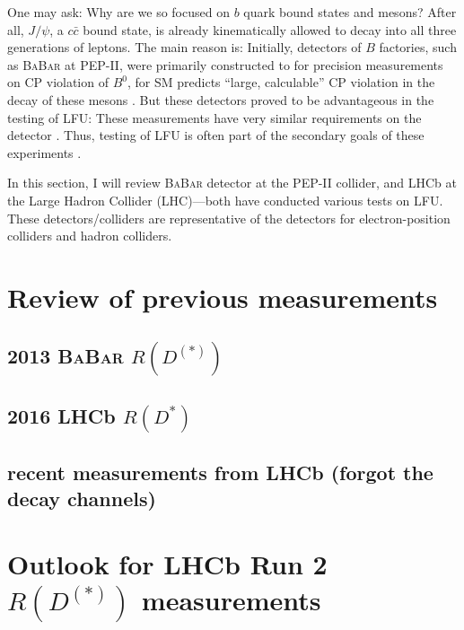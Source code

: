 \documentclass[10pt]{article}
\newcommand{\PRLrule}{
    \bigskip
    \noindent\makebox[\linewidth]{
        \resizebox{0.3333\linewidth}{1pt}{$\blacklozenge$}
    }
    \bigskip
}
\def\BaBar/{\textsc{BaBar}}
\begin{document}
One may ask: Why are we so focused on $b$ quark bound states and mesons?
After all, $J/\psi$, a $c\bar{c}$ bound state, is already kinematically allowed
to decay into all three generations of leptons.
The main reason is:
Initially, detectors of $B$ factories, such as \BaBar/ at PEP-II, were
primarily constructed to for precision measurements on CP violation of $B^0$,
for SM predicts ``large, calculable'' CP violation in the decay of these mesons
\cite{Luth:1994}.
But these detectors proved to be advantageous in the testing of LFU:
These measurements have very similar requirements on the
detector \cite{Boutigny:1995ib}.
Thus, testing of LFU is often part of the secondary goals of these
experiments \cite{Luth:1994}.

In this section, I will review \BaBar/ detector at the PEP-II collider, and LHCb
at the Large Hadron Collider (LHC)---both have conducted various tests on LFU.
These detectors/colliders are representative of the detectors for
electron-position colliders and hadron colliders.


%


\section{Review of previous measurements}

\subsection{2013 \BaBar/ $R(D^{(*)})$}

\subsection{2016 LHCb $R(D^{*})$}

\subsection{recent measurements from LHCb (forgot the decay channels)}


\section{Outlook for LHCb Run 2 $R(D^{(*)})$ measurements}



\PRLrule
\printbibliography
\end{document}
